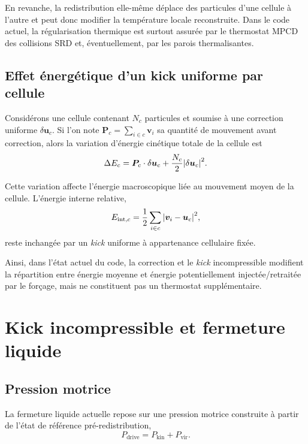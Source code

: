 \documentclass[11pt,a4paper]{article}
\begin{document}
En revanche, la redistribution elle-même déplace des particules d'une cellule à l'autre et peut donc modifier la température locale reconstruite. Dans le code actuel, la régularisation thermique est surtout assurée par le thermostat MPCD des collisions SRD et, éventuellement, par les parois thermalisantes.

\subsection{Effet énergétique d'un kick uniforme par cellule}

Considérons une cellule contenant $N_c$ particules et soumise à une correction uniforme $\delta \bm{u}_c$. Si l'on note $\bm{P}_c = \sum_{i\in c} \bm{v}_i$ sa quantité de mouvement avant correction, alors la variation d'énergie cinétique totale de la cellule est
\begin{equation}
 \Delta E_c = \bm{P}_c\cdot \delta \bm{u}_c + \frac{N_c}{2}\abs{\delta \bm{u}_c}^2.
\end{equation}

Cette variation affecte l'énergie macroscopique liée au mouvement moyen de la cellule. L'énergie interne relative,
\begin{equation}
 E_{\mathrm{int},c} = \frac{1}{2}\sum_{i\in c}\abs{\bm{v}_i-\bm{u}_c}^2,
\end{equation}
reste inchangée par un \emph{kick} uniforme à appartenance cellulaire fixée.

Ainsi, dans l'état actuel du code, la correction et le \emph{kick} incompressible modifient la répartition entre énergie moyenne et énergie potentiellement injectée/retraitée par le forçage, mais ne constituent pas un thermostat supplémentaire.

\section{Kick incompressible et fermeture liquide}

\subsection{Pression motrice}

La fermeture liquide actuelle repose sur une pression motrice construite à partir de l'état de référence pré-redistribution,
\begin{equation}
 P_{\mathrm{drive}} = P_{\mathrm{kin}} + P_{\mathrm{vir}}.
\end{equation}
\end{document}
